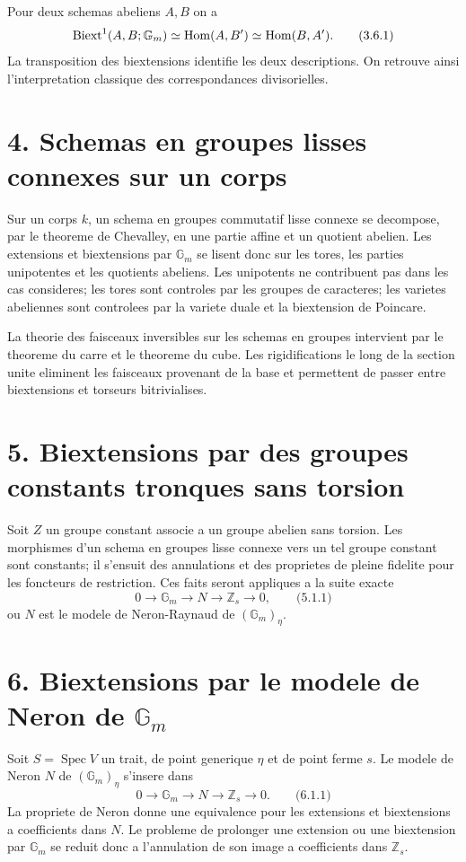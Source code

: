 \documentclass[11pt]{article}
\providecommand{\Spec}{\operatorname{Spec}}
\providecommand{\Z}{\mathbb Z}
\providecommand{\Gm}{\mathbb G_m}
\providecommand{\Hom}{\operatorname{Hom}}
\begin{document}
Pour deux schemas abeliens \(A,B\) on a
\[
        \Biext^1(A,B;\Gm)\simeq \Hom(A,B')\simeq \Hom(B,A').
\qquad\text{(3.6.1)}
\]
La transposition des biextensions identifie les deux descriptions.  On retrouve ainsi l'interpretation classique des correspondances divisorielles.

\section*{4. Schemas en groupes lisses connexes sur un corps}

Sur un corps \(k\), un schema en groupes commutatif lisse connexe se decompose, par le theoreme de Chevalley, en une partie affine et un quotient abelien.  Les extensions et biextensions par \(\Gm\) se lisent donc sur les tores, les parties unipotentes et les quotients abeliens.  Les unipotents ne contribuent pas dans les cas consideres; les tores sont controles par les groupes de caracteres; les varietes abeliennes sont controlees par la variete duale et la biextension de Poincare.

La theorie des faisceaux inversibles sur les schemas en groupes intervient par le theoreme du carre et le theoreme du cube.  Les rigidifications le long de la section unite eliminent les faisceaux provenant de la base et permettent de passer entre biextensions et torseurs bitrivialises.

\section*{5. Biextensions par des groupes constants tronques sans torsion}

Soit \(Z\) un groupe constant associe a un groupe abelien sans torsion.  Les morphismes d'un schema en groupes lisse connexe vers un tel groupe constant sont constants; il s'ensuit des annulations et des proprietes de pleine fidelite pour les foncteurs de restriction.  Ces faits seront appliques a la suite exacte
\[
        0\longrightarrow \Gm\longrightarrow N\longrightarrow \Z_s\longrightarrow 0,
\qquad\text{(5.1.1)}
\]
ou \(N\) est le modele de Neron-Raynaud de \((\Gm)_\eta\).

\section*{6. Biextensions par le modele de Neron de \(\Gm\)}

Soit \(S=\Spec V\) un trait, de point generique \(\eta\) et de point ferme \(s\).  Le modele de Neron \(N\) de \((\Gm)_\eta\) s'insere dans
\[
        0\longrightarrow \Gm\longrightarrow N\longrightarrow \Z_s\longrightarrow 0.
\qquad\text{(6.1.1)}
\]
La propriete de Neron donne une equivalence pour les extensions et biextensions a coefficients dans \(N\).  Le probleme de prolonger une extension ou une biextension par \(\Gm\) se reduit donc a l'annulation de son image a coefficients dans \(\Z_s\).
\end{document}

